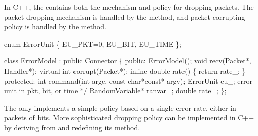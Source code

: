 In C++, the  contains both the mechanism and policy for
dropping packets.  The packet dropping mechanism is handled by the
 method, and packet corrupting policy is handled by the
 method.
\begin{program}
        enum ErrorUnit \{ EU_PKT=0, EU_BIT, EU_TIME \};

        class ErrorModel : public Connector \{
        public:
                ErrorModel();
                void recv(Packet*, Handler*);
                virtual int corrupt(Packet*);
                inline double rate() \{ return rate_; \}
        protected:
                int command(int argc, const char*const* argv);
                ErrorUnit eu_;          \* error unit in pkt, bit, or time */
                RandomVariable* ranvar_;
                double rate_;
        \};
\end{program}
The  only implements a simple policy based on a single
error rate, either in packets of bits.  More sophisticated dropping
policy can be implemented in C++ by deriving from  and
redefining its  method.
